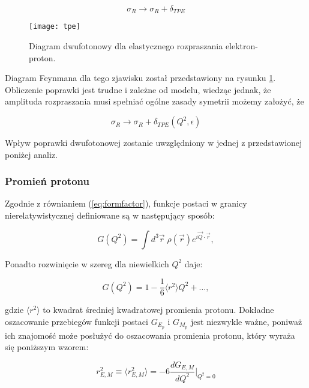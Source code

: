 \documentclass[11pt]{book}
\theoremstyle{definition}
\begin{document}
\begin{equation}
\sigma_R \rightarrow \sigma_R + \delta_{TPE}
\end{equation}

%
\begin{figure}[htp!]
	\centering
	\texttt{[image: tpe]}
	\caption{Diagram dwufotonowy dla elastycznego rozpraszania elektron-proton.} 
	\label{fig:tpe}
\end{figure}


Diagram Feynmana dla tego zjawisku został przedstawiony na rysunku \ref{fig:tpe}. Obliczenie poprawki jest trudne i zależne od modelu, wiedząc jednak, że amplituda rozpraszania musi spełniać ogólne zasady symetrii możemy założyć, że 

\begin{equation}
\sigma_R \rightarrow \sigma_R + \delta_{TPE}\left(Q^2, \epsilon\right)
\end{equation}

Wpływ poprawki dwufotonowej zostanie uwzględniony w jednej z przedstawionej poniżej analiz. 

\subsubsection{Promień protonu}

Zgodnie z równianiem (\ref{eq:formfactor}), funkcje postaci w granicy nierelatywistycznej definiowane są w następujący sposób:

\begin{equation*}
G(Q^2) = \int d^3 \vec{r} \; \rho(\vec{r}) e^{i\vec{Q}\cdot \vec{r}} ,
\end{equation*}

Ponadto rozwinięcie w szereg dla niewielkich $Q^2$ daje:

\begin{equation}
G(Q^2) = 1 - \frac{1}{6}\langle r^2 \rangle Q^2 + \dots,
\end{equation}

gdzie $\langle r^2 \rangle$ to kwadrat średniej kwadratowej promienia protonu. 
Dokładne oszacowanie przebiegów funkcji postaci $G_{E_p}$ i $G_{M_p}$ jest niezwykle ważne, poniważ ich znajomość może posłużyć do oszacowania promienia protonu, który wyraża się poniższym wzorem: 



\begin{equation}
r_{E,M}^2 \equiv \langle r_{E,M}^2  \rangle = -6 \frac{d G_{E,M}}{d Q^2} \biggr\rvert_{Q^2 = 0}
\end{equation}
\end{document}
